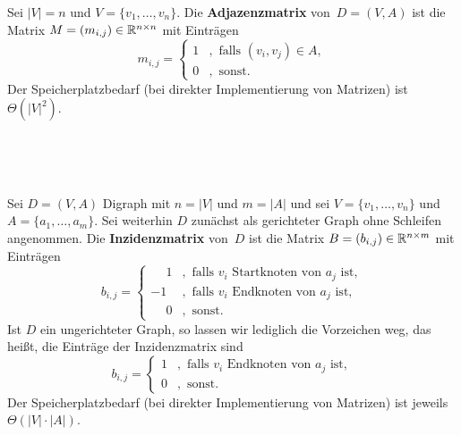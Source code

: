 \begin{defn} 
Sei $|V|=n$ und $V=\{v_1,\ldots,v_n\}$.
Die \textbf{Adjazenzmatrix} von~$D = (V,A)$ ist die Matrix $M=(m_{i,j}) \in \mathbb{R}^{n \times n}$ mit Einträgen
\[
m_{i,j} = \begin{cases}1&,\text{ falls } (v_i,v_j) \in A,\\ 0&,\text{ sonst}.\end{cases}
\]
Der Speicherplatzbedarf (bei direkter Implementierung von Matrizen) ist $\Theta(|V|^2)$.
\end{defn} 

\begin{bsp}\
\begin{center}
	\hfill
	\hfill
	\hfill\,
\end{center}

\end{bsp} 

\begin{defn}
Sei $D=(V,A)$ Digraph mit $n=|V|$ und $m=|A|$ und sei $V=\{v_1,\ldots,v_n\}$ und $A=\{a_1,\ldots,a_m\}$.
Sei weiterhin $D$ zunächst als gerichteter Graph ohne Schleifen angenommen.
Die \textbf{Inzidenzmatrix} von~$D$ ist die Matrix $B=(b_{i,j}) \in \mathbb{R}^{n \times m}$ mit Einträgen
\[
b_{i,j} = \begin{cases}\phantom{-}1&,\text{ falls }v_i\text{ Startknoten von }a_j\text{ ist},\\ -1&,\text{ falls }v_i\text{ Endknoten von }a_j\text{ ist},\\ \phantom{-}0&,\text{ sonst}.\end{cases}
\]
\condclearpage
Ist $D$ ein ungerichteter Graph, so lassen wir lediglich die Vorzeichen weg, das heißt, die Einträge der Inzidenzmatrix sind
\[
b_{i,j} = \begin{cases}1&,\text{ falls }v_i\text{ Endknoten von }a_j\text{ ist},\\ 0&,\text{ sonst}.\end{cases}
\]
Der Speicherplatzbedarf (bei direkter Implementierung von Matrizen) ist jeweils $\Theta(|V|\cdot|A|)$.
\end{defn} 

